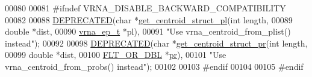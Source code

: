 \begin{DoxyCode}
00080 
00081 \textcolor{preprocessor}{#ifndef VRNA\_DISABLE\_BACKWARD\_COMPATIBILITY}
00082 
00088 \mbox{\hyperlink{centroid_8h_aab347a3c03fbe8e7319551b9fa0cce4a}{DEPRECATED}}(\textcolor{keywordtype}{char}  *\mbox{\hyperlink{centroid_8h_a7dcc64bcefcf682396dd3bbea02416fe}{get\_centroid\_struct\_pl}}(\textcolor{keywordtype}{int} length,
00089                               \textcolor{keywordtype}{double} *dist,
00090                               \mbox{\hyperlink{group__struct__utils_structvrna__elem__prob__s}{vrna\_ep\_t}} *pl),
00091           \textcolor{stringliteral}{"Use vrna\_centroid\_from\_plist() instead"});
00092 
00098 \mbox{\hyperlink{centroid_8h_aab347a3c03fbe8e7319551b9fa0cce4a}{DEPRECATED}}(\textcolor{keywordtype}{char}  *\mbox{\hyperlink{centroid_8h_ac92486ce514677256f4a832dc518759c}{get\_centroid\_struct\_pr}}(\textcolor{keywordtype}{int} length,
00099                               \textcolor{keywordtype}{double} *dist,
00100                               \mbox{\hyperlink{group__data__structures_ga31125aeace516926bf7f251f759b6126}{FLT\_OR\_DBL}} *\mbox{\hyperlink{fold__vars_8h_ac98ec419070aee6831b44e5c700f090f}{pr}}),
00101           \textcolor{stringliteral}{"Use vrna\_centroid\_from\_probs() instead"});
00102 
00103 \textcolor{preprocessor}{#endif}
00104 
00105 \textcolor{preprocessor}{#endif}
\end{DoxyCode}
